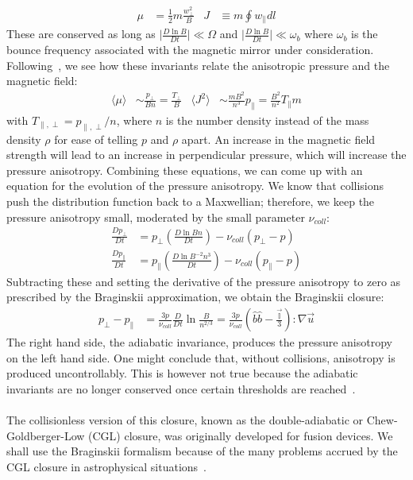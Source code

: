 \begin{align*}
  \mu&=\frac12m\frac{w_\perp^2}{B} &  J&\equiv m\oint w_\parallel dl
\end{align*}
These are conserved as long as $\big|\frac{D\ln B}{Dt}\big|\ll\Omega$ and $\big|\frac{D\ln B}{Dt}\big|\ll\omega_b$ where $\omega_b$ is the bounce frequency associated with the magnetic mirror under consideration. Following~\citet{KunzBraginskii}, we see how these invariants relate the anisotropic pressure and the magnetic field:
\begin{align}
  \langle\mu\rangle&\sim\frac{p_\perp}{Bn}=\frac{T_\perp}{B} &  \langle J^2\rangle&\sim\frac{mB^2}{n^3}p_\parallel=\frac{B^2}{n^2}T_\parallel m\label{eq:javg}
\end{align}
with $T_{\parallel,\perp}=p_{\parallel,\perp}/n$, where $n$ is the number density instead of the mass density $\rho$ for ease of telling $p$ and $\rho$ apart. An increase in the magnetic field strength will lead to an increase in perpendicular pressure, which will increase the pressure anisotropy. Combining these equations, we can come up with an equation for the evolution of the pressure anisotropy. We know that collisions push the distribution function back to a Maxwellian; therefore, we keep the pressure anisotropy small, moderated by the small parameter $\nu_{coll}$:
\begin{align*}
  \frac{Dp_\perp}{Dt}&=p_\perp\left(\frac{D\ln Bn}{Dt}\right)-\nu_{coll}(p_\perp-p)\\
  \frac{Dp_\parallel}{Dt}&=p_\parallel\left(\frac{D\ln B^{-2}n^3}{Dt}\right)-\nu_{coll}(p_\parallel-p)
\end{align*}
Subtracting these and setting the derivative of the pressure anisotropy to zero as prescribed by the Braginskii approximation, we obtain the Braginskii closure:
\begin{align}
  p_\perp-p_\parallel&=\frac{3p}{\nu_{coll}}\frac{D}{Dt}\ln\frac{B}{n^{2/3}}=\frac{3p}{\nu_{coll}}\left(\hat b\hat b-\frac{\vec{\mathbb{I}}}{3}\right):\nabla\vec u \label{eq:bragclos}
\end{align}
The right hand side, the adiabatic invariance, produces the pressure anisotropy on the left hand side. One might conclude that, without collisions, anisotropy is produced uncontrollably. This is however not true because the adiabatic invariants are no longer conserved once certain thresholds are reached~\cite{Sharma2006}. \\
\\
The collisionless version of this closure, known as the double-adiabatic or Chew-Goldberger-Low (CGL) closure, was originally developed for fusion devices. We shall use the Braginskii formalism because of the many problems accrued by the CGL closure in astrophysical situations~\cite{Sharma2006}.\\
